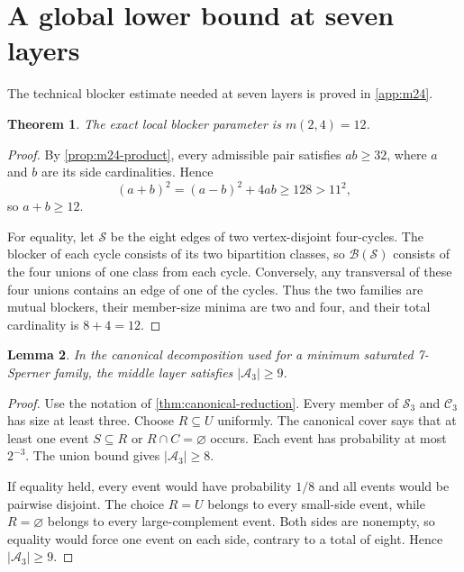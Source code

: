 \documentclass[a4paper,fleqn,longmktitle]{cas-sc}
\newtheorem{theorem}{Theorem}[section]
\newtheorem{lemma}[theorem]{Lemma}
\theoremstyle{definition}
\theoremstyle{remark}
\newcommand{\blocker}{\mathcal{B}}
\begin{document}
\section{A global lower bound at seven layers}
\label{sec:sat7-lower}

The technical blocker estimate needed at seven layers is proved in
\cref{app:m24}.

\begin{theorem}
\label{thm:m24}
The exact local blocker parameter is $m(2,4)=12$.
\end{theorem}

\begin{proof}
By \cref{prop:m24-product}, every admissible pair satisfies
$ab\geq32$, where $a$ and $b$ are its side cardinalities.  Hence
\[
  (a+b)^2=(a-b)^2+4ab\geq128>11^2,
\]
so $a+b\geq12$.

For equality, let $\mathcal S$ be the eight edges of two vertex-disjoint
four-cycles.  The blocker of each cycle consists of its two bipartition
classes, so $\blocker(\mathcal S)$ consists of the four unions of one class
from each cycle.  Conversely, any transversal of these four unions contains
an edge of one of the cycles.  Thus the two families are mutual blockers,
their member-size minima are two and four, and their total cardinality is
$8+4=12$.
\end{proof}

\begin{lemma}
\label{lem:middle-nine}
In the canonical decomposition used for a minimum saturated 7-Sperner
family, the middle layer satisfies $|\mathcal A_3|\geq9$.
\end{lemma}

\begin{proof}
Use the notation of \cref{thm:canonical-reduction}.  Every member of
$\mathcal S_3$ and $\mathcal C_3$ has size at least three.  Choose
$R\subseteq U$ uniformly.  The canonical cover says that at least one event
$S\subseteq R$ or $R\cap C=\varnothing$ occurs.  Each event has probability
at most $2^{-3}$.  The union bound gives
$|\mathcal A_3|\geq8$.

If equality held, every event would have probability $1/8$ and all events
would be pairwise disjoint.  The choice $R=U$ belongs to every small-side
event, while $R=\varnothing$ belongs to every large-complement event.  Both
sides are nonempty, so equality would force one event on each side, contrary
to a total of eight.  Hence $|\mathcal A_3|\geq9$.
\end{proof}
\end{document}
